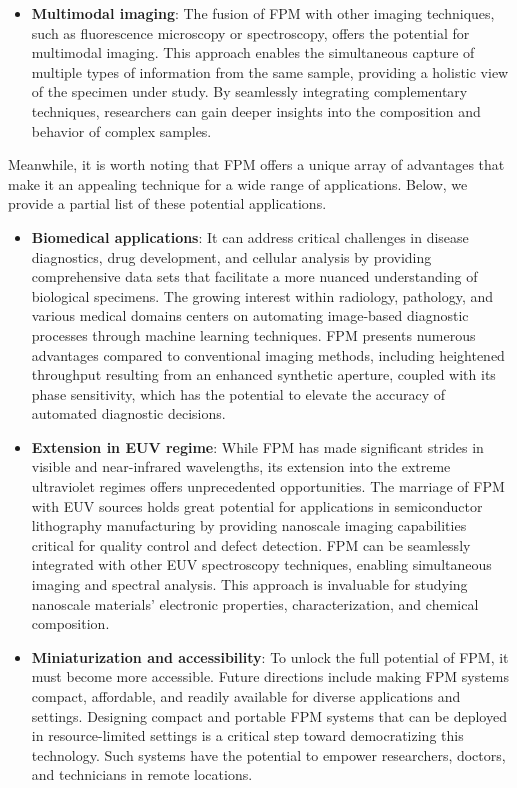 \documentclass[journal,review,submit,pdftex,moreauthors]{Definitions/mdpi}
\begin{document}
\begin{itemize}
     \item \textbf{Multimodal imaging}: The fusion of FPM with other imaging techniques, such as fluorescence microscopy or spectroscopy, offers the potential for multimodal imaging. This approach enables the simultaneous capture of multiple types of information from the same sample, providing a holistic view of the specimen under study. By seamlessly integrating complementary techniques, researchers can gain deeper insights into the composition and behavior of complex samples.
\end{itemize}

Meanwhile, it is worth noting that FPM offers a unique array of advantages that make it an appealing technique for a wide range of applications. Below, we provide a partial list of these potential applications.
\begin{itemize}

       \item \textbf{Biomedical applications}: It can address critical challenges in disease diagnostics, drug development, and cellular analysis by providing comprehensive data sets that facilitate a more nuanced understanding of biological specimens. The growing interest within radiology, pathology, and various medical domains centers on automating image-based diagnostic processes through machine learning techniques. FPM presents numerous advantages compared to conventional imaging methods, including heightened throughput resulting from an enhanced synthetic aperture, coupled with its phase sensitivity, which has the potential to elevate the accuracy of automated diagnostic decisions.
       
      \item \textbf{Extension in EUV regime}: While FPM has made significant strides in visible and near-infrared wavelengths, its extension into the extreme ultraviolet regimes offers unprecedented opportunities. The marriage of FPM with EUV sources holds great potential for applications in semiconductor lithography manufacturing by providing nanoscale imaging capabilities critical for quality control and defect detection. FPM can be seamlessly integrated with other EUV spectroscopy techniques, enabling simultaneous imaging and spectral analysis. This approach is invaluable for studying nanoscale materials' electronic properties, characterization, and chemical composition.

        \item \textbf{Miniaturization and accessibility}: To unlock the full potential of FPM, it must become more accessible. Future directions include making FPM systems compact, affordable, and readily available for diverse applications and settings. Designing compact and portable FPM systems that can be deployed in resource-limited settings is a critical step toward democratizing this technology. Such systems have the potential to empower researchers, doctors, and technicians in remote locations.


\end{itemize}
\end{document}
